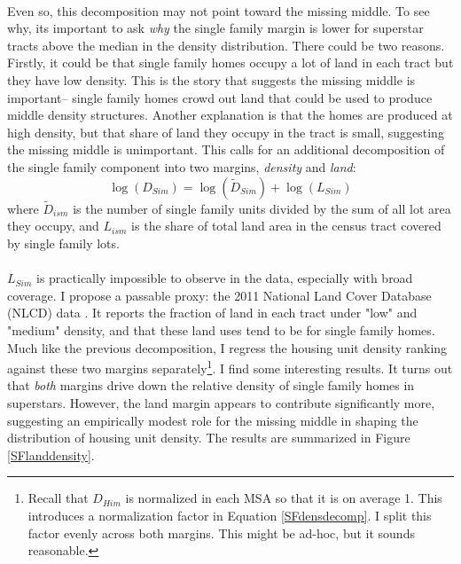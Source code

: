 \documentclass[]{article}
\theoremstyle{plain}
\begin{document}
 \paragraph*{}
Even so, this decomposition may not point toward the missing middle. To see why, its important to ask \textit{why} the single family margin is lower for superstar tracts above the median in the density distribution. There could be two reasons. Firstly, it could be that single family homes occupy a lot of land in each tract but they have low density. This is the story that suggests the missing middle is important-- single family homes crowd out land that could be used to produce middle density structures. Another explanation is that the homes are produced at high density, but that share of land they occupy in the tract is small, suggesting the missing middle is unimportant. This calls for an additional decomposition of the single family component into two margins, \textit{density} and \textit{land}:
\begin{equation}\label{SFdensdecomp}
\log(D_{Sim}) = \log(\tilde{D}_{Sim}) + \log(L_{Sim})
\end{equation}
where $\tilde{D}_{ism}$ is the number of single family units divided by the sum of all lot area they occupy, and $L_{ism}$ is the share of total land area in the census tract covered by single family lots. 
\paragraph*{}
$L_{Sim}$ is practically impossible to observe in the data, especially with broad coverage. I propose a passable proxy: the 2011 National Land Cover Database (NLCD) data \citep{YANG2018}. It reports the fraction of land in each tract under "low" and "medium" density, and that these land uses tend to be for single family homes. Much like the previous decomposition, I regress the housing unit density ranking against these two margins separately\footnote{Recall that $D_{Him}$ is normalized in each MSA so that it is on average 1. This introduces a normalization factor in Equation \ref{SFdensdecomp}. I split this factor evenly across both margins. This might be ad-hoc, but it sounds reasonable.}. I find some interesting results. It turns out that \textit{both} margins drive down the relative density of single family homes in superstars. However, the land margin appears to contribute significantly more, suggesting an empirically modest role for the missing middle in shaping the distribution of housing unit density. The results are summarized in Figure \ref{SFlanddensity}.  
\end{document}
